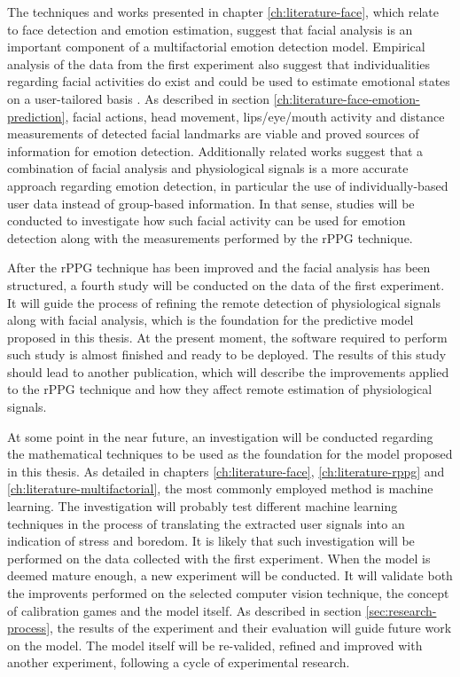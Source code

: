The techniques and works presented in chapter \ref{ch:literature-face}, which relate to face detection and emotion estimation, suggest that facial analysis is an important component of a multifactorial emotion detection model. Empirical analysis of the data from the first experiment also suggest that individualities regarding facial activities do exist and could be used to estimate emotional states on a user-tailored basis \parencite{bevilacqua2016variations}. As described in section \ref{ch:literature-face-emotion-prediction}, facial actions, head movement, lips/eye/mouth activity and distance measurements of detected facial landmarks are viable and proved sources of information for emotion detection. Additionally related works suggest that a combination of facial analysis and physiological signals is a more accurate approach regarding emotion detection, in particular the use of individually-based user data instead of group-based information. In that sense, studies will be conducted to investigate how such facial activity can be used for emotion detection along with the measurements performed by the rPPG technique.

After the rPPG technique has been improved and the facial analysis has been structured, a fourth study will be conducted on the data of the first experiment. It will guide the process of refining the remote detection of physiological signals along with facial analysis, which is the foundation for the predictive model proposed in this thesis. At the present moment, the software required to perform such study is almost finished and ready to be deployed. The results of this study should lead to another publication, which will describe the improvements applied to the rPPG technique and how they affect remote estimation of physiological signals.

At some point in the near future, an investigation will be conducted regarding the mathematical techniques to be used as the foundation for the model proposed in this thesis. As detailed in chapters \ref{ch:literature-face}, \ref{ch:literature-rppg} and \ref{ch:literature-multifactorial}, the most commonly employed method is machine learning. The investigation will probably test different machine learning techniques in the process of translating the extracted user signals into an indication of stress and boredom. It is likely that such investigation will be performed on the data collected with the first experiment. When the model is deemed mature enough, a new experiment will be conducted. It will validate both the improvents performed on the selected computer vision technique, the concept of calibration games and the model itself. As described in section \ref{sec:research-process}, the results of the experiment and their evaluation will guide future work on the model. The model itself will be re-valided, refined and improved with another experiment, following a cycle of experimental research.
